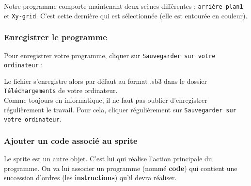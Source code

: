 
Notre programme comporte maintenant deux scènes différentes : \texttt{arrière-plan1} et \texttt{Xy-grid}. C'est cette dernière qui est sélectionnée (elle est entourée en couleur).







\subsubsection{Enregistrer le programme}

Pour enregistrer votre programme, cliquer sur \texttt{Sauvegarder sur votre ordinateur} :


Le fichier s'enregistre alors par défaut au format .sb3 dans le dossier \texttt{Téléchargements} de votre ordinateur.\\




Comme toujours en informatique, il ne faut pas oublier d'enregistrer régulièrement le travail. Pour cela, cliquer régulièrement sur \texttt{Sauvegarder sur votre ordinateur}.










\subsubsection{Ajouter un code associé au sprite}\label{ScriptLutin}

Le sprite est un autre objet. C'est lui qui réalise l'action principale du programme. On va lui associer un programme (nommé \textbf{code}) qui contient une succession d'ordres (les \textbf{instructions}) qu'il devra réaliser.  \\

